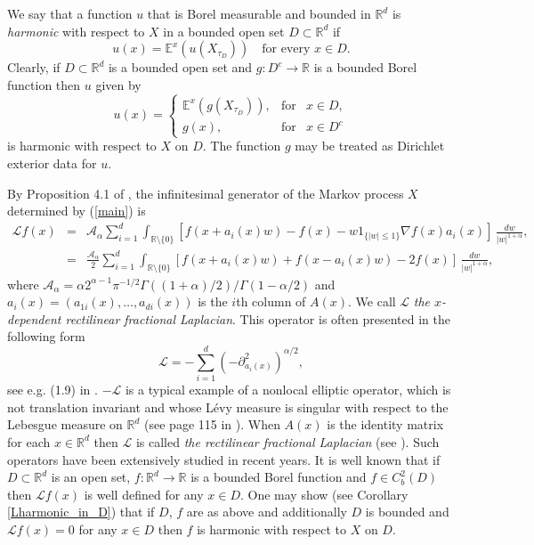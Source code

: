 \documentclass[a4paper,12pt,reqno]{amsart}
\theoremstyle{definition}
\theoremstyle{remark}
\newcommand{\Aa}{\mathcal{A}_{\alpha}}
\newcommand{\calL}{\mathcal{L}}
\newcommand{\Ee}{\mathds{E}} %
\newcommand{\R}{\mathds{R}}
\begin{document}
We say that a function $u$ that is Borel measurable and bounded in $\R^d$ is {\it harmonic} with respect to $X$ in a bounded open set $D \subset \R^d$ if 
$$
u(x) = \Ee^x(u(X_{\tau_D})) \quad \text{for every $x \in D$.}
$$
Clearly, if $D \subset \R^d$ is a bounded open set and $g: D^c \to \R$ is a bounded Borel function then $u$ given by
\begin{equation}
\label{Dirichlet}
u(x)= \left\{              
\begin{array}{lll}                   
\Ee^x(g(X_{\tau_D})),&\text{for}& x \in D, \\  
g(x),&\text{for}& x \in D^c
\end{array}       
\right. 
\end{equation}
is harmonic with respect to $X$ on $D$. The function $g$ may be treated as Dirichlet exterior data for $u$.

By Proposition 4.1 of \cite{BC2006}, the infinitesimal generator of the Markov process $X$ determined by (\ref{main}) is 
\begin{eqnarray}
\nonumber
\calL f(x) &=&  \Aa \sum_{i = 1}^d   \int_{\R \setminus \{0\}} \left[f(x + a_i(x) w) - f(x) - w 1_{\{|w| \le 1\}} \nabla f(x) a_i(x)\right] \, \frac{dw}{|w|^{1 + \alpha}},\\
\label{operator_L}
&=& \frac{\Aa}{2} \sum_{i = 1}^d   \int_{\R \setminus \{0\}} \left[f(x + a_i(x) w) + f(x - a_i(x) w) - 2f(x) \right] \, \frac{dw}{|w|^{1 + \alpha}},
\end{eqnarray}
where $\Aa = \alpha 2^{\alpha-1} \pi^{-1/2} \Gamma((1+\alpha)/2)/ \Gamma(1-\alpha/2)$ and  $a_i(x) = (a_{1i}(x),\ldots, a_{di}(x))$ is the $i$th column of $A(x)$. We call $\calL$ {\it the $x$-dependent rectilinear fractional Laplacian}. This operator is often presented in the following form
$$
\calL = -\sum_{i = 1}^d \left(-\partial_{a_i(x)}^2\right)^{\alpha/2},
$$
see e.g. (1.9) in \cite{FR2024}. $-\calL$ is a typical example of a nonlocal elliptic operator, which is not translation invariant and whose  
L{\'e}vy measure is singular with respect to the Lebesgue measure on $\R^d$ (see page 115 in \cite{FR2024book}). When  $A(x)$ is the identity matrix for each $x \in \R^d$ then $\calL$ is called {\it the rectilinear fractional Laplacian} (see \cite{CHZ2025}). Such operators have been extensively studied in recent years. It is well known that if $D \subset \R^d$ is an open set, $f:\R^d \to \R$ is a bounded Borel function and $f \in C_b^2(D)$ then $\calL f(x)$ is well defined for any $x \in D$. One may show (see Corollary \ref{Lharmonic_in_D}) that if $D$, $f$ are as above and additionally $D$ is bounded and $\calL f(x) = 0$ for any $x \in D$ then $f$ is harmonic with respect to $X$ on $D$. 
\end{document}
